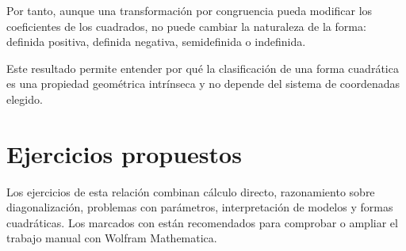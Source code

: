 Por tanto, aunque una transformación por congruencia pueda modificar los coeficientes de los cuadrados, no puede cambiar la naturaleza de la forma: definida positiva, definida negativa, semidefinida o indefinida.

Este resultado permite entender por qué la clasificación de una forma cuadrática es una propiedad geométrica intrínseca y no depende del sistema de coordenadas elegido.

\section*{Ejercicios propuestos}

Los ejercicios de esta relación combinan cálculo directo, razonamiento sobre diagonalización, problemas con parámetros, interpretación de modelos y formas cuadráticas. Los marcados con \M están recomendados para comprobar o ampliar el trabajo manual con Wolfram Mathematica.

